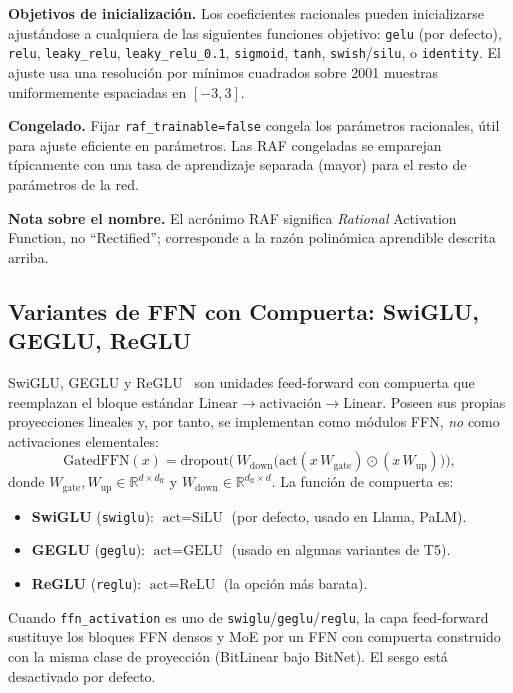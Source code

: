 \textbf{Objetivos de inicialización.} Los coeficientes racionales pueden
inicializarse ajustándose a cualquiera de las siguientes funciones objetivo:
\texttt{gelu} (por defecto), \texttt{relu}, \texttt{leaky\_relu},
\texttt{leaky\_relu\_0.1}, \texttt{sigmoid}, \texttt{tanh},
\texttt{swish}/\texttt{silu}, o \texttt{identity}. El ajuste usa una
resolución por mínimos cuadrados sobre 2001 muestras uniformemente espaciadas
en $[-3,3]$.

\textbf{Congelado.} Fijar \texttt{raf\_trainable=false} congela los parámetros
racionales, útil para ajuste eficiente en parámetros. Las RAF congeladas se
emparejan típicamente con una tasa de aprendizaje separada (mayor) para el
resto de parámetros de la red.

\textbf{Nota sobre el nombre.} El acrónimo RAF significa \emph{Rational}
Activation Function, no ``Rectified''; corresponde a la razón polinómica
aprendible descrita arriba.

\subsection{Variantes de FFN con Compuerta: SwiGLU, GEGLU, ReGLU}
\label{sec:glu-es}

SwiGLU, GEGLU y ReGLU~\citep{shazeer2020glu} son unidades feed-forward con
compuerta que reemplazan el bloque estándar
$\text{Linear}\to\text{activación}\to\text{Linear}$. Poseen sus propias
proyecciones lineales y, por tanto, se implementan como módulos FFN, \emph{no}
como activaciones elementales:
\[
  \text{GatedFFN}(x) = \text{dropout}\!\Big(\,
    W_{\text{down}}\Big(\text{act}(x\,W_{\text{gate}})
    \odot (x\,W_{\text{up}})\Big)\Big),
\]
donde $W_{\text{gate}}, W_{\text{up}}\in\mathbb{R}^{d\times d_{\text{ff}}}$ y
$W_{\text{down}}\in\mathbb{R}^{d_{\text{ff}}\times d}$. La función de compuerta
es:
\begin{itemize}[leftmargin=*]
  \item \textbf{SwiGLU} (\texttt{swiglu}): $\text{act}=\text{SiLU}$
    (por defecto, usado en Llama, PaLM).
  \item \textbf{GEGLU} (\texttt{geglu}): $\text{act}=\text{GELU}$
    (usado en algunas variantes de T5).
  \item \textbf{ReGLU} (\texttt{reglu}): $\text{act}=\text{ReLU}$
    (la opción más barata).
\end{itemize}

\noindent Cuando \texttt{ffn\_activation} es uno de
\texttt{swiglu}/\texttt{geglu}/\texttt{reglu}, la capa feed-forward sustituye
los bloques FFN densos y MoE por un FFN con compuerta construido con la misma
clase de proyección (BitLinear bajo BitNet). El sesgo está desactivado por
defecto.

